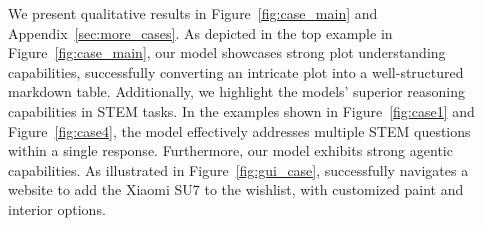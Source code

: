 We present qualitative results in Figure~\ref{fig:case_main} and Appendix~\ref{sec:more_cases}.
As depicted in the top example in Figure~\ref{fig:case_main}, our model showcases strong plot understanding capabilities, successfully converting an intricate plot into a well-structured markdown table.
Additionally, we highlight the models' superior reasoning capabilities in STEM tasks.
In the examples shown in Figure~\ref{fig:case1} and Figure~\ref{fig:case4}, the model effectively addresses multiple STEM questions within a single response.
Furthermore, our model exhibits strong agentic capabilities.
As illustrated in Figure~\ref{fig:gui_case}, \mimovl{} successfully navigates a website to add the Xiaomi SU7 to the wishlist, with customized paint and interior options.




